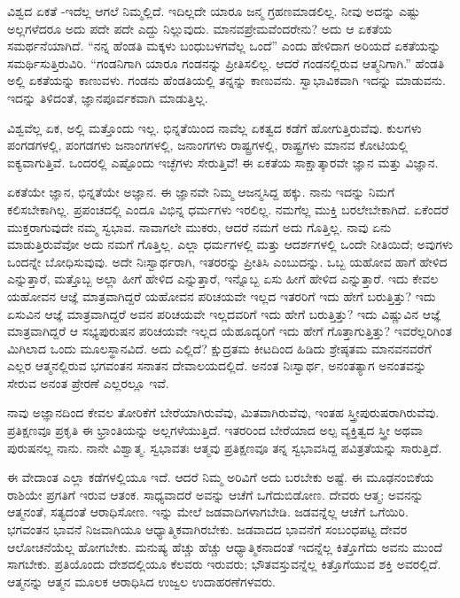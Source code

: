 ವಿಶ್ವದ ಏಕತೆ -ಇದೆಲ್ಲ ಆಗಲೆ ನಿಮ್ಮಲ್ಲಿದೆ. ಇದಿಲ್ಲದೇ ಯಾರೂ ಜನ್ಮ ಗ್ರಹಣಮಾಡಲಿಲ್ಲ. ನೀವು ಅದನ್ನು ಎಷ್ಟು ಅಲ್ಲಗಳೆದರೂ ಅದು ಪದೇ ಪದೇ ಎದ್ದು ನಿಲ್ಲುವುದು. ಮಾನವಪ್ರೇಮವೆಂದರೇನು? ಅದು ಆ ಏಕತೆಯ ಸಮರ್ಥನೆಯಾಗಿದೆ. “ನನ್ನ ಹೆಂಡತಿ ಮಕ್ಕಳು ಬಂಧುಬಳಗವೆಲ್ಲ ಒಂದೆ'' ಎಂದು ಹೇಳಿದಾಗ ಅರಿಯದೆ ಏಕತೆಯನ್ನು ಸಮರ್ಥಿಸುತ್ತಿರುವಿರಿ. “ಗಂಡನಿಗಾಗಿ ಯಾರೂ ಗಂಡನನ್ನು ಪ್ರೀತಿಸಲಿಲ್ಲ. ಆದರೆ ಗಂಡನಲ್ಲಿರುವ ಆತ್ಮನಿಗಾಗಿ.” ಹೆಂಡತಿ ಅಲ್ಲಿ ಏಕತೆಯನ್ನು ಕಾಣುವಳು. ಗಂಡನು ಹೆಂಡತಿಯಲ್ಲಿ ತನ್ನನ್ನು ಕಾಣುವನು. ಸ್ವಾಭಾವಿಕವಾಗಿ ಇದನ್ನು ಮಾಡುವನು. ಇದನ್ನು ತಿಳಿದಂತೆ, ಜ್ಞಾನಪೂರ್ವಕವಾಗಿ ಮಾಡುತ್ತಿಲ್ಲ.

ವಿಶ್ವವೆಲ್ಲ ಏಕ, ಅಲ್ಲಿ ಮತ್ತೊಂದು ಇಲ್ಲ. ಭಿನ್ನತೆಯಿಂದ ನಾವೆಲ್ಲ ಏಕತ್ವದ ಕಡೆಗೆ ಹೋಗುತ್ತಿರುವೆವು. ಕುಲಗಳು ಪಂಗಡಗಳಲ್ಲಿ, ಪಂಗಡಗಳು ಜನಾಂಗಗಳಲ್ಲಿ, ಜನಾಂಗಗಳು ರಾಷ್ಟ್ರಗಳಲ್ಲಿ, ರಾಷ್ಟ್ರಗಳು ಮಾನವ ಕೋಟಿಯಲ್ಲಿ ಐಕ್ಯವಾಗುತ್ತಿವೆ. ಒಂದರಲ್ಲಿ ಎಷ್ಟೊಂದು ಇಚ್ಛೆಗಳು ಸೇರುತ್ತಿವೆ! ಈ ಏಕತೆಯ ಸಾಕ್ಷಾತ್ಕಾರವೇ ಜ್ಞಾನ ಮತ್ತು ವಿಜ್ಞಾನ.

ಏಕತೆಯೇ ಜ್ಞಾನ, ಭಿನ್ನತೆಯೇ ಅಜ್ಞಾನ. ಈ ಜ್ಞಾನವೇ ನಿಮ್ಮ ಆಜನ್ಮಸಿದ್ದ ಹಕ್ಕು. ನಾನು ಇದನ್ನು ನಿಮಗೆ ಕಲಿಸಬೇಕಾಗಿಲ್ಲ. ಪ್ರಪಂಚದಲ್ಲಿ ಎಂದೂ ವಿಭಿನ್ನ ಧರ್ಮಗಳು ಇರಲಿಲ್ಲ. ನಮಗೆಲ್ಲ ಮುಕ್ತಿ ಬರಲೇಬೇಕಾಗಿದೆ. ಏಕೆಂದರೆ ಮುಕ್ತರಾಗುವುದೇ ನಮ್ಮ ಸ್ವಭಾವ. ನಾವಾಗಲೇ ಮುಕರು, ಆದರೆ ನಮಗೆ ಅದು ಗೊತ್ತಿಲ್ಲ. ನಾವು ಏನು ಮಾಡುತ್ತಿರುವೆವೋ ಅದು ನಮಗೆ ಗೊತ್ತಿಲ್ಲ. ಎಲ್ಲಾ ಧರ್ಮಗಳಲ್ಲಿ ಮತ್ತು ಆದರ್ಶಗಳಲ್ಲಿ ಒಂದೇ ನೀತಿಯಿದೆ; ಅವುಗಳು ಒಂದನ್ನೇ ಬೋಧಿಸುವುವು. ಅದೇ ನಿಃಸ್ವಾರ್ಥರಾಗಿ, ಇತರರನ್ನು ಪ್ರೀತಿಸಿ ಎಂಬುದನ್ನು. ಒಬ್ಬ ಯಹೋವ ಹಾಗೆ ಹೇಳಿದ ಎನ್ನುತ್ತಾರೆ, ಮತ್ತೊಬ್ಬ ಅಲ್ಲಾ ಹೀಗೆ ಹೇಳಿದ ಎನ್ನುತ್ತಾರೆ, ಇನ್ನೊಬ್ಬ ಏಸು ಹೀಗೆ ಹೇಳಿದ ಎನ್ನುತ್ತಾರೆ. ಇದು ಕೇವಲ ಯಹೋವನ ಆಜ್ಞೆ ಮಾತ್ರವಾಗಿದ್ದರೆ ಯಹೋವನ ಪರಿಚಯವೇ ಇಲ್ಲದ ಇತರರಿಗೆ ಇದು ಹೇಗೆ ಬರುತ್ತಿತ್ತು? ಇದು ಏಸುವಿನ ಆಜ್ಞೆ ಮಾತ್ರವಾಗಿದ್ದರೆ ಅವನ ಪರಿಚಯವೇ ಇಲ್ಲದವರಿಗೆ ಇದು ಹೇಗೆ ಬರುತ್ತಿತ್ತು? ಇದು ವಿಷ್ಣುವಿನ ಆಜ್ಞೆ ಮಾತ್ರವಾಗಿದ್ದರೆ ಆ ಸಭ್ಯಪುರುಷನ ಪರಿಚಯವೇ ಇಲ್ಲದ ಯೆಹೂದ್ಯರಿಗೆ ಇದು ಹೇಗೆ ಗೊತ್ತಾಗುತ್ತಿತ್ತು? ಇವರೆಲ್ಲರಿಗಿಂತ ಮಿಗಿಲಾದ ಒಂದು ಮೂಲಸ್ಥಾನವಿದೆ. ಅದು ಎಲ್ಲಿದೆ? ಕ್ಷುದ್ರತಮ ಕೀಟದಿಂದ ಹಿಡಿದು ಶ್ರೇಷ್ಠತಮ ಮಾನವನವರೆಗೆ ಎಲ್ಲರ ಆತ್ಮನಲ್ಲಿರುವ ಭಗವಂತನ ಸನಾತನ ದೇವಾಲಯದಲ್ಲಿದೆ. ಅನಂತ ನಿಃಸ್ವಾರ್ಥ, ಅನಂತತ್ಯಾಗ ಅನಂತವನ್ನು ಸೇರುವ ಅನಂತ ಪ್ರೇರಣೆ ಎಲ್ಲರಲ್ಲೂ ಇವೆ.

ನಾವು ಅಜ್ಞಾನದಿಂದ ಕೇವಲ ತೋರಿಕೆಗೆ ಬೇರೆಯಾಗಿರುವೆವು, ಮಿತವಾಗಿರುವೆವು, ಇಂತಹ ಸ್ತ್ರೀಪುರುಷರಾಗಿರುವೆವು. ಪ್ರತಿಕ್ಷಣವೂ ಪ್ರಕೃತಿ ಈ ಭ್ರಾಂತಿಯನ್ನು ಅಲ್ಲಗಳೆಯುತ್ತಿದೆ. ಇತರರಿಂದ ಬೇರೆಯಾದ ಅಲ್ಪ ವ್ಯಕ್ತಿತ್ವದ ಸ್ತ್ರೀ ಅಥವಾ ಪುರುಷನಲ್ಲ ನಾನು. ನಾನೇ ವಿಶ್ವಾತ್ಮ. ಸ್ವಭಾವತಃ ಆತ್ಮವು ಪ್ರತಿಕ್ಷಣವೂ ತನ್ನ ಸ್ವಭಾವಸಿದ್ದ ಪವಿತ್ರತೆಯನ್ನು ಸಾರುತ್ತಿದೆ.

ಈ ವೇದಾಂತ ಎಲ್ಲಾ ಕಡೆಗಳಲ್ಲಿಯೂ ಇದೆ. ಆದರೆ ನಿಮ್ಮ ಅರಿವಿಗೆ ಅದು ಬರಬೇಕು ಅಷ್ಟೆ. ಈ ಮೂಢನಂಬಿಕೆಯ ರಾಶಿಯೇ ಪ್ರಗತಿಗೆ ಇರುವ ಆತಂಕ. ಸಾಧ್ಯವಾದರೆ ಅವನ್ನು ಆಚೆಗೆ ಒಗೆದುಬಿಡೋಣ. ದೇವರು ಆತ್ಮ; ಅವನನ್ನು ಆತ್ಮನಂತೆ, ಸತ್ಯದಂತೆ ಆರಾಧಿಸೋಣ. ಇನ್ನು ಮೇಲೆ ಜಡವಾದಿಗಳಾಗಬೇಡಿ. ಜಡವನ್ನೆಲ್ಲ ಆಚೆಗೆ ಒಗೆಯಿರಿ. ಭಗವಂತನ ಭಾವನೆ ನಿಜವಾಗಿಯೂ ಆಧ್ಯಾತ್ಮಿಕವಾಗಿರಬೇಕು. ಜಡವಾದದ ಭಾವನೆಗೆ ಸಂಬಂಧಪಟ್ಟ ದೇವರ ಆಲೋಚನೆಯೆಲ್ಲ ಹೋಗಬೇಕು. ಮನುಷ್ಯ ಹೆಚ್ಚು ಹೆಚ್ಚು ಆಧ್ಯಾತ್ಮಿಕನಾದಂತೆ ಇದನ್ನೆಲ್ಲ ಕಿತ್ತೊಗೆದು ಅವನು ಮುಂದೆ ಸಾಗಬೇಕು. ಪ್ರತಿಯೊಂದು ದೇಶದಲ್ಲಿಯೂ ಕೆಲವರು ಇರುವರು; ಭೌತವಸ್ತುವನ್ನೆಲ್ಲ ಕಿತ್ತೊಗೆಯುವ ಶಕ್ತಿ ಅವರಲ್ಲಿದೆ. ಆತ್ಮನನ್ನು ಆತ್ಮನ ಮೂಲಕ ಆರಾಧಿಸಿದ ಉಜ್ವಲ ಉದಾಹರಣೆಗಳವರು.

